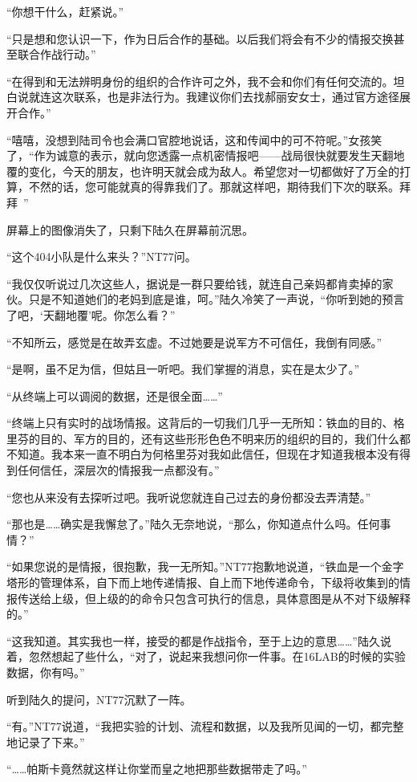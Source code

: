 “你想干什么，赶紧说。”

“只是想和您认识一下，作为日后合作的基础。以后我们将会有不少的情报交换甚至联合作战行动。”

“在得到和无法辨明身份的组织的合作许可之外，我不会和你们有任何交流的。坦白说就连这次联系，也是非法行为。我建议你们去找郝丽安女士，通过官方途径展开合作。”

“嘻嘻，没想到陆司令也会满口官腔地说话，这和传闻中的可不符呢。”女孩笑了，“作为诚意的表示，就向您透露一点机密情报吧——战局很快就要发生天翻地覆的变化，今天的朋友，也许明天就会成为敌人。希望您对一切都做好了万全的打算，不然的话，您可能就真的得靠我们了。那就这样吧，期待我们下次的联系。拜拜~”

屏幕上的图像消失了，只剩下陆久在屏幕前沉思。

“这个404小队是什么来头？”NT77问。

“我仅仅听说过几次这些人，据说是一群只要给钱，就连自己亲妈都肯卖掉的家伙。只是不知道她们的老妈到底是谁，呵。”陆久冷笑了一声说，“你听到她的预言了吧，‘天翻地覆’呢。你怎么看？”

“不知所云，感觉是在故弄玄虚。不过她要是说军方不可信任，我倒有同感。”

“是啊，虽不足为信，但姑且一听吧。我们掌握的消息，实在是太少了。”

“从终端上可以调阅的数据，还是很全面……”

“终端上只有实时的战场情报。这背后的一切我们几乎一无所知：铁血的目的、格里芬的目的、军方的目的，还有这些形形色色不明来历的组织的目的，我们什么都不知道。我本来一直不明白为何格里芬对我如此信任，但现在才知道我根本没有得到任何信任，深层次的情报我一点都没有。”

“您也从来没有去探听过吧。我听说您就连自己过去的身份都没去弄清楚。”

“那也是……确实是我懈怠了。”陆久无奈地说，“那么，你知道点什么吗。任何事情？”

“如果您说的是情报，很抱歉，我一无所知。”NT77抱歉地说道，“铁血是一个金字塔形的管理体系，自下而上地传递情报、自上而下地传递命令，下级将收集到的情报传送给上级，但上级的的命令只包含可执行的信息，具体意图是从不对下级解释的。”

“这我知道。其实我也一样，接受的都是作战指令，至于上边的意思……”陆久说着，忽然想起了些什么，“对了，说起来我想问你一件事。在16LAB的时候的实验数据，你有吗。”

听到陆久的提问，NT77沉默了一阵。

“有。”NT77说道，“我把实验的计划、流程和数据，以及我所见闻的一切，都完整地记录了下来。”

“……帕斯卡竟然就这样让你堂而皇之地把那些数据带走了吗。”

